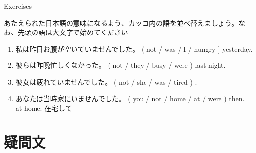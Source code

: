 \documentclass[aspectratio=169,xcolor={dvipsnames,table}]{beamer}
\newcommand{\myaudio}[1]{\href{#1}{\faVolumeUp}}
\begin{document}
\begin{frame}[plain]{Exercises}

{\small あたえられた日本語の意味になるよう、カッコ内の語を並べ替えましょう。なお、先頭の語は大文字で始めてください}

\begin{enumerate}
 \item {\small 私は昨日お腹が空いていませんでした。}
( not / was / I / hungry ) yesterday.\\
 \item 
{\small 彼らは昨晩忙しくなかった。}
( not / they / busy / were ) last night.\\
 \item 
{\small 彼女は疲れていませんでした。}
( not / she / was / tired ) .\\
 \item 
{\small あなたは当時家にいませんでした。}
( you / not / home / at / were ) then.\\
\hfill{\scriptsize at home: 在宅して}
\end{enumerate}

\hfill{\scriptsize \myaudio{./audio/024_past_be_05.mp3}}

\end{frame}


\section{疑問文}
\end{document}
